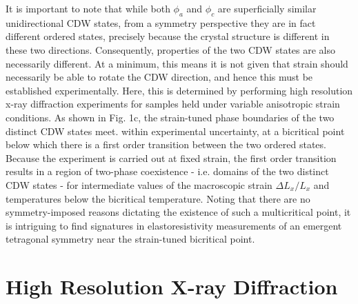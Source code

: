 \documentclass[%
 reprint, %
amsmath,amssymb,
aps,
]{revtex4-2}
\begin{document}
It is important to note that while both $\phi_a$ and $\phi_c$ are superficially similar unidirectional CDW states, from a symmetry perspective they are in fact different ordered states, precisely because the crystal structure is different in these two directions. Consequently, properties of the two CDW states are also necessarily different. At a minimum, this means it is not given that strain should necessarily be able to rotate the CDW direction, and hence this must be established experimentally. Here, this is determined by performing high resolution x-ray diffraction experiments for samples held under variable anisotropic strain conditions. As shown in Fig. 1c, the strain-tuned phase boundaries of the two distinct CDW states meet. within experimental uncertainty, at a  bicritical  point below which there is a first order transition between the two ordered states.  Because the experiment is carried out at fixed strain, the first order transition results in a region of two-phase coexistence - i.e. domains of the two distinct CDW states - for intermediate values of the macroscopic strain $\Delta L_x/L_x$ and temperatures below the bicritical temperature. Noting that there are no symmetry-imposed reasons dictating the existence of such a multicritical point, it is intriguing to find signatures in elastoresistivity measurements of an emergent tetragonal symmetry near the strain-tuned bicritical point. 








\section{High Resolution X-ray Diffraction}
\end{document}
